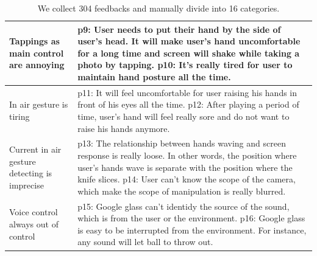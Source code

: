 \begin{table}[!h]
\begin{tabular}{|p{}|p{}|}
     \hline
     \multicolumn{1}{|p{0.3\columnwidth}|}{Tappings as main control are annoying} & 
     \multicolumn{1}{|p{0.5\columnwidth}|}{p9: User needs to put their hand by the side of user's head. It will make user's hand uncomfortable for a long time and screen will shake while taking a photo by tapping. p10: It's really tired for user to maintain hand posture all the time.} \\
     \hline
     \multicolumn{1}{|p{0.3\columnwidth}|}{In air gesture is tiring} & 
     \multicolumn{1}{|p{0.5\columnwidth}|}{p11: It will feel uncomfortable for user raising his hands in front of his eyes all the time. p12: After playing a period of time, user's hand will feel really sore and do not want to raise his hands anymore.} \\
     \hline
     \multicolumn{1}{|p{0.3\columnwidth}|}{Current in air gesture detecting is imprecise} & 
     \multicolumn{1}{|p{0.5\columnwidth}|}{p13: The relationship between hands waving and screen response is really loose. In other words, the position where user's hands wave is separate with the position where the knife slices. p14: User can't know the scope of the camera, which make the scope of manipulation is really blurred.} \\
     \hline
     \multicolumn{1}{|p{0.3\columnwidth}|}{Voice control always out of control} & 
     \multicolumn{1}{|p{0.5\columnwidth}|}{p15: Google glass can't identidy the source of the sound, which is from the user or the environment. p16: Google glass is easy to be interrupted from the environment. For instance, any sound will let ball to throw out.} \\
     \hline
   \end{tabular}
   \caption{We collect 304 feedbacks and manually divide into 16 categories.}
   \label{tab:issueType}
 \end{table}


